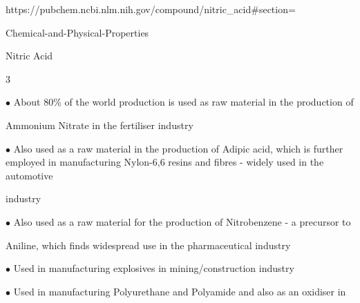 \documentclass[a4paper,portrait,12pt]{article}
\begin{document}
\begin{flushleft}
https://pubchem.ncbi.nlm.nih.gov/compound/nitric\_acid\#section=
\end{flushleft}


\begin{flushleft}
Chemical-and-Physical-Properties
\end{flushleft}





\begin{flushleft}
\newpage
Nitric Acid
\end{flushleft}





3





\begin{flushleft}
$\bullet$ About 80\% of the world production is used as raw material in the production of
\end{flushleft}


\begin{flushleft}
Ammonium Nitrate in the fertiliser industry
\end{flushleft}


\begin{flushleft}
$\bullet$ Also used as a raw material in the production of Adipic acid, which is further employed in manufacturing Nylon-6,6 resins and fibres - widely used in the automotive
\end{flushleft}


\begin{flushleft}
industry
\end{flushleft}


\begin{flushleft}
$\bullet$ Also used as a raw material for the production of Nitrobenzene - a precursor to
\end{flushleft}


\begin{flushleft}
Aniline, which finds widespread use in the pharmaceutical industry
\end{flushleft}


\begin{flushleft}
$\bullet$ Used in manufacturing explosives in mining/construction industry
\end{flushleft}


\begin{flushleft}
$\bullet$ Used in manufacturing Polyurethane and Polyamide and also as an oxidiser in
\end{flushleft}
\end{document}

